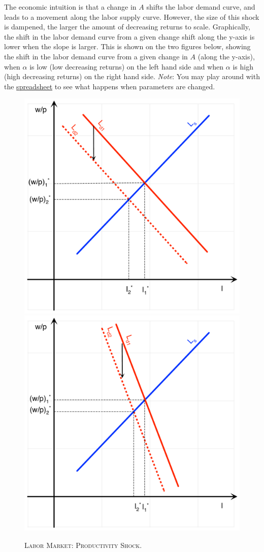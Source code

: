 \documentclass[]{book}
\theoremstyle{definition}
\theoremstyle{definition}
\theoremstyle{definition}
\theoremstyle{remark}
\begin{document}
\begin{enumerate}
  The economic intuition is that a change in \(A\) shifts the labor
  demand curve, and leads to a movement along the labor supply curve.
  However, the size of this shock is dampened, the larger the amount of
  decreasing returns to scale. Graphically, the shift in the labor
  demand curve from a given change shift along the y-axis is lower when
  the slope is larger. This is shown on the two figures below, showing
  the shift in the labor demand curve from a given change in \(A\)
  (along the y-axis), when \(\alpha\) is low (low decreasing returns) on
  the left hand side and when \(\alpha\) is high (high decreasing
  returns) on the right hand side. \emph{Note}: You may play around with
  the
  \href{https://docs.google.com/spreadsheets/d/1h9JJD8K2_IE166gdj78waf0zu4YDY9Rp3r5oiJR_06s/edit?usp=sharing}{spreadsheet}
  to see what happens when parameters are changed.
\end{enumerate}



\begin{figure}

{\centering \includegraphics[width=0.49\linewidth,height=1\textheight]{graphsketcher/labor-market-productivity-shock-low-alpha} \includegraphics[width=0.49\linewidth,height=1\textheight]{graphsketcher/labor-market-productivity-shock-high-alpha} 

}

\caption{\textsc{Labor Market: Productivity Shock}.}\label{fig:labor-market-prod-shock}
\end{figure}
\end{document}
